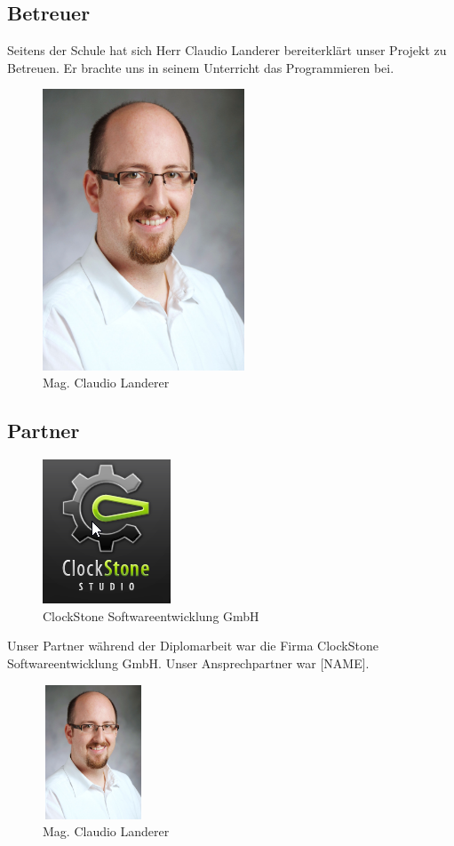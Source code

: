 \subsection{Betreuer}
Seitens der Schule hat sich Herr Claudio Landerer bereiterklärt unser Projekt zu Betreuen. Er brachte uns in seinem Unterricht das Programmieren bei. 
	\begin{figure}[H]
		\centering
		\includegraphics[width=6cm]{images/Landerer_Claudio.jpg}
		\caption{Mag. Claudio Landerer}
	\end{figure}
		
\newpage
\subsection{Partner}
\begin{figure}[H]
	\centering
	\includegraphics[]{images/ClockstoneLogo.png}
	\caption{ClockStone Softwareentwicklung GmbH}
\end{figure}
Unser Partner während der Diplomarbeit war die Firma ClockStone Softwareentwicklung GmbH. Unser Ansprechpartner war [NAME].
\begin{figure}[H]
	\centering
	\includegraphics[width=3cm, height=4cm]{images/Landerer_Claudio.jpg}
	\caption{Mag. Claudio Landerer}
\end{figure}
